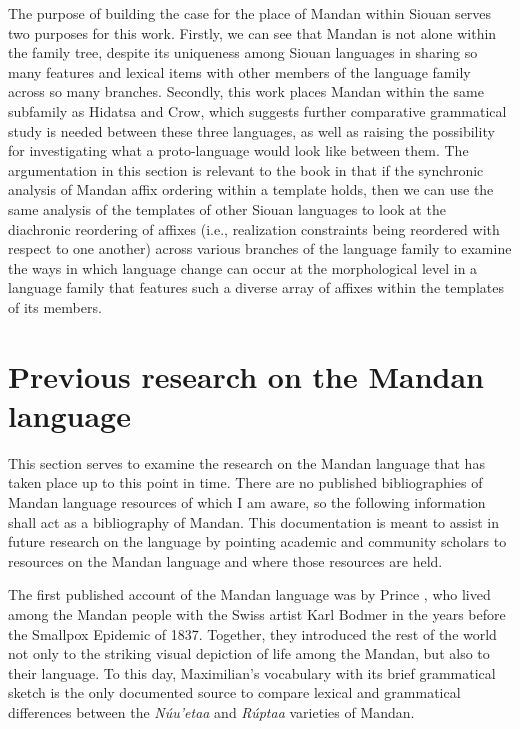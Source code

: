 The purpose of building the case for the place of Mandan within Siouan serves two purposes for this work. Firstly, we can see that Mandan is not alone within the family tree, despite its uniqueness among Siouan languages in sharing so many features and lexical items with other members of the language family across so many branches. Secondly, this work places Mandan within the same subfamily as Hidatsa and Crow, which suggests further comparative grammatical study is needed between these three languages, as well as raising the possibility for investigating what a proto-language would look like between them. The argumentation in this section is relevant to the book in that if the synchronic analysis of Mandan affix ordering within a template holds, then we can use the same analysis of the templates of other Siouan languages to look at the diachronic reordering of affixes (i.e., realization constraints being reordered with respect to one another) across various branches of the language family to examine the ways in which language change can occur at the morphological level in a language family that features such a diverse array of affixes within the templates of its members.

\section{Previous research on the Mandan language}\label{previousresearch}

This section serves to examine the research on the Mandan language that has taken place up to this point in time. There are no published bibliographies of Mandan language resources of which I am aware, so the following information shall act as a bibliography of Mandan. This documentation is meant to assist in future research on the language by pointing academic and community scholars to resources on the Mandan language and where those resources are held.

The first published account of the Mandan language was by Prince \citet{maximilian1839}, who lived among the Mandan people with the Swiss artist Karl Bodmer in the years before the Smallpox Epidemic of 1837. Together, they introduced the rest of the world not only to the striking visual depiction of life among the Mandan, but also to their language. To this day, Maximilian's vocabulary with its brief grammatical sketch is the only documented source to compare lexical and grammatical differences between the \textit{Núu'etaa} and \textit{Rúptaa} varieties of Mandan.

